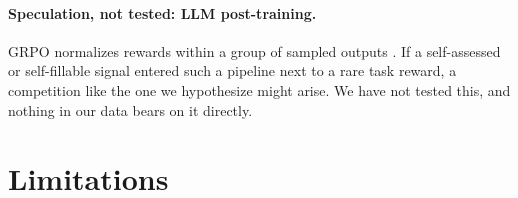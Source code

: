 \documentclass[11pt,letterpaper]{article}
\begin{document}
\paragraph{Speculation, not tested: LLM post-training.}
GRPO normalizes rewards within a group of sampled outputs \citep{shao2024deepseekmath}. If a self-assessed or
self-fillable signal entered such a pipeline next to a rare task reward, a competition like the one we hypothesize
might arise. We have not tested this, and nothing in our data bears on it directly.

\section{Limitations}
\label{sec:limitations}
\end{document}
